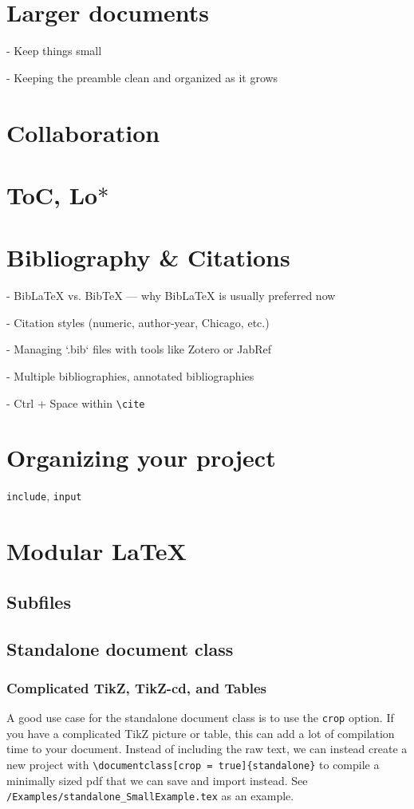 \documentclass[]{article}
\begin{document}
\section{Larger documents}
- Keep things small

- Keeping the preamble clean and organized as it grows
\section{Collaboration}
\section{ToC, Lo$\ast$}
\section{Bibliography \& Citations}
- BibLaTeX vs. BibTeX — why BibLaTeX is usually preferred now

- Citation styles (numeric, author-year, Chicago, etc.)

- Managing `.bib` files with tools like Zotero or JabRef

- Multiple bibliographies, annotated bibliographies

- Ctrl + Space within \verb|\cite|
\section{Organizing your project}
\verb|include|, \verb|input|
\section{Modular LaTeX}
\subsection{Subfiles}
\subsection{Standalone document class}
\subsubsection{Complicated TikZ, TikZ-cd, and Tables}
A good use case for the standalone document class is to use the \verb|crop| option. If you have a complicated TikZ picture or table, this can add a lot of compilation time to your document. Instead of including the raw text, we can instead create a new project with \verb|\documentclass[crop = true]{standalone}| to compile a minimally sized pdf that we can save and import instead. See \verb|/Examples/standalone_SmallExample.tex| as an example.
\end{document}
